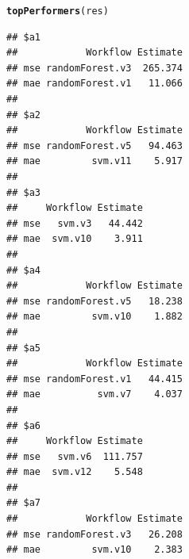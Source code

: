 \documentclass[10pt,a4paper]{article}\usepackage[]{graphicx}\usepackage[]{color}
\makeatletter
\newcommand{\hlstd}[1]{\textcolor[rgb]{0.345,0.345,0.345}{#1}}%
\newcommand{\hlkwd}[1]{\textcolor[rgb]{0.737,0.353,0.396}{\textbf{#1}}}%
\newenvironment{kframe}{%
 \def\at@end@of@kframe{}%
 \ifinner\ifhmode%
  \def\at@end@of@kframe{\end{minipage}}%
  \begin{minipage}{\columnwidth}%
 \fi\fi%
 \def\FrameCommand##1{\hskip\@totalleftmargin \hskip-\fboxsep
 \colorbox{shadecolor}{##1}\hskip-\fboxsep
     \hskip-\linewidth \hskip-\@totalleftmargin \hskip\columnwidth}%
 \MakeFramed {\advance\hsize-\width
   \@totalleftmargin\z@ \linewidth\hsize
   \@setminipage}}%
 {\par\unskip\endMakeFramed%
 \at@end@of@kframe}
\newenvironment{knitrout}{}{} %
\makeatother
\begin{document}
\begin{knitrout}\scriptsize
{}\color{fgcolor}\begin{kframe}
\begin{alltt}
\hlkwd{topPerformers}\hlstd{(res)}
\end{alltt}
\begin{verbatim}
## $a1
##            Workflow Estimate
## mse randomForest.v3  265.374
## mae randomForest.v1   11.066
## 
## $a2
##            Workflow Estimate
## mse randomForest.v5   94.463
## mae         svm.v11    5.917
## 
## $a3
##     Workflow Estimate
## mse   svm.v3   44.442
## mae  svm.v10    3.911
## 
## $a4
##            Workflow Estimate
## mse randomForest.v5   18.238
## mae         svm.v10    1.882
## 
## $a5
##            Workflow Estimate
## mse randomForest.v1   44.415
## mae          svm.v7    4.037
## 
## $a6
##     Workflow Estimate
## mse   svm.v6  111.757
## mae  svm.v12    5.548
## 
## $a7
##            Workflow Estimate
## mse randomForest.v3   26.208
## mae         svm.v10    2.383
\end{verbatim}
\end{kframe}
\end{knitrout}
\end{document}

